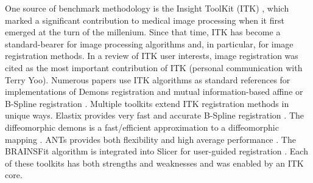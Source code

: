 \documentclass{frontiersSCNS}
\begin{document}





One source of benchmark methodology is the Insight ToolKit (ITK)
\cite{Yoo2002,Ackerman2003}, which marked a significant contribution to
medical image processing when it first emerged at the turn of the millenium.
Since that time, ITK has become a standard-bearer for image
processing algorithms and, in particular, for image registration
methods.  In a review of ITK user interests, image registration was cited as the most important
contribution of ITK (personal communication with Terry Yoo).  Numerous papers use ITK
algorithms as standard references for implementations of Demons
registration and mutual information-based affine or B-Spline
registration \cite{2004,Shelton2005,Floca2007,Chen2008,Cheung2009}.
Multiple toolkits extend ITK registration methods in unique ways.
Elastix provides very fast and accurate B-Spline registration
\cite{Klein2010,Murphy2011}.  The diffeomorphic demons is a fast/efficient
approximation to a diffeomorphic mapping \cite{Vercauteren2009}.  
ANTs provides both flexibility and high average performance
\cite{Avants2011}.  The BRAINSFit algorithm is integrated into Slicer
for user-guided registration \cite{Kikinis2011}.
Each of these toolkits has both strengths and weaknesses
\cite{Klein2010,Murphy2011} and was enabled by an ITK core.    
\end{document}

